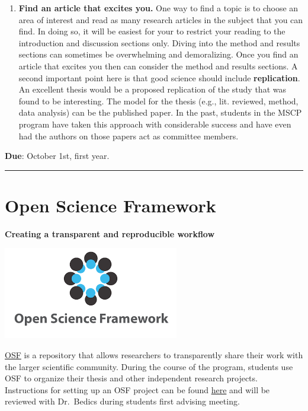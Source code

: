 \documentclass[
  openany]{book}
\begin{document}
\begin{enumerate}
\item
  \textbf{Find an article that excites you.} One way to find a topic is to choose an area of interest and read as many research articles in the subject that you can find. In doing so, it will be easiest for your to restrict your reading to the introduction and discussion sections only. Diving into the method and results sections can sometimes be overwhelming and demoralizing. Once you find an article that excites you then can consider the method and results sections. A second important point here is that good science should include \textbf{replication}. An excellent thesis would be a proposed replication of the study that was found to be interesting. The model for the thesis (e.g., lit. reviewed, method, data analysis) can be the published paper. In the past, students in the MSCP program have taken this approach with considerable success and have even had the authors on those papers act as committee members.
\end{enumerate}

\textbf{Due}: October 1st, first year.

\begin{center}\rule{0.5\linewidth}{0.5pt}\end{center}

\hypertarget{open-science-framework}{%
\section{Open Science Framework}\label{open-science-framework}}

\textbf{Creating a transparent and reproducible workflow}

\includegraphics{images/osf.png}

\href{https://accounts.osf.io/login?campaign=institution\&service=https\%3A\%2F\%2Fosf.io\%2Flogin\%2F\%3Fnext\%3Dhttps\%253A\%252F\%252Fosf.io\%252F}{OSF} is a repository that allows researchers to transparently share their work with the larger scientific community. During the course of the program, students use OSF to organize their thesis and other independent research projects. Instructions for setting up an OSF project can be found \href{https://speakerdeck.com/jdbedics/osf-setup-and-class-project-introduction}{here} and will be reviewed with Dr.~Bedics during students first advising meeting.
\end{document}
